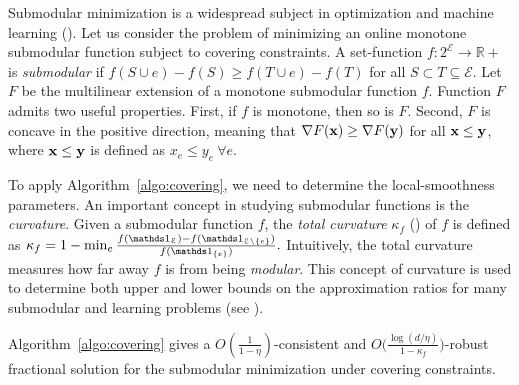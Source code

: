 Submodular minimization is a widespread subject in optimization and machine learning (\cite{IwataFleischer01:A-combinatorial-strongly,Bachothers13:Learning-with,Bach16:Submodular-functions:,BalkanskiSinger:2020}). Let us consider the problem of minimizing an online monotone submodular function subject to covering constraints.
A set-function $f: 2^{\mathcal{E}} \rightarrow \mathbb{R}+$ is \emph{submodular} if
$f(S \cup e) - f(S) \geq f(T \cup e) - f(T)$ for all $S \subset T \subseteq \mathcal{E}$.
Let $F$ be the multilinear extension of a monotone submodular function $f$. Function $F$
admits two useful properties. First, if $f$ is monotone, then so is $F$. Second, $F$ is concave in
the positive direction, meaning that $\nabla F(\mathbf{x}) \geq \nabla F(\mathbf{y})$ for all $\mathbf{x} \leq \mathbf{y}$, where $\mathbf{x} \leq \mathbf{y}$ is defined as $x_{e} \leq y_{e} ~\forall e$.

To apply Algorithm~\ref{algo:covering}, we need to determine the local-smoothness parameters.
An important concept in studying submodular functions is the \emph{curvature}. Given a submodular
function $f$, the \emph{total curvature} $\kappa_{f}$ (\cite{ConfortiCornuejols84:Submodular-set-functions}) of $f$ is defined as
$
\kappa_{f} = 1 - \min_{e} \frac{f(\one_{\mathcal{E}}) - f(\one_{\mathcal{E} \setminus \{e\}})}{f(\one_{\{e\}})}.
$
Intuitively, the total curvature measures how far away $f$ is from being \emph{modular}. This concept of
curvature is used to determine both upper and lower bounds on the approximation ratios
for many submodular and learning problems (see \cite{ConfortiCornuejols84:Submodular-set-functions,GoemansHarvey09:Approximating-submodular,BalcanHarvey12:Learning-Submodular,Vondrak10:Submodularity-and-Curvature:,IyerJegelka13:Curvature-and-optimal,SviridenkoVondrak17:Optimal-approximation}).

\begin{proposition}
Algorithm~\ref{algo:covering} gives a
$O(\frac{1}{1 - \eta})$-consistent and $O\bigl( \frac{\log (d/\eta)}{1 - \kappa_{f}} \bigr)$-robust fractional  solution
for the submodular minimization under covering constraints.
\end{proposition}
